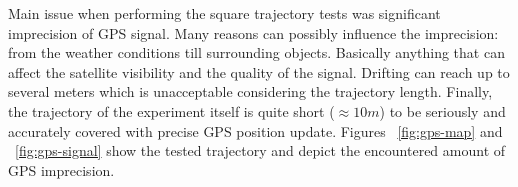 Main issue when performing the square trajectory tests was significant imprecision of GPS signal. Many reasons can possibly influence the imprecision: from the weather conditions till surrounding objects. Basically anything that can affect the satellite visibility and the quality of the signal. Drifting can reach up to several meters which is unacceptable considering the trajectory length. Finally, the trajectory of the experiment itself is quite short ($ \approx 10 m $) to be seriously and accurately covered with precise GPS position update. Figures ~\ref{fig:gps-map} and ~\ref{fig:gps-signal} show the tested trajectory and depict the encountered amount of GPS imprecision.
\begin{figure}%
  \centering
\end{figure}


